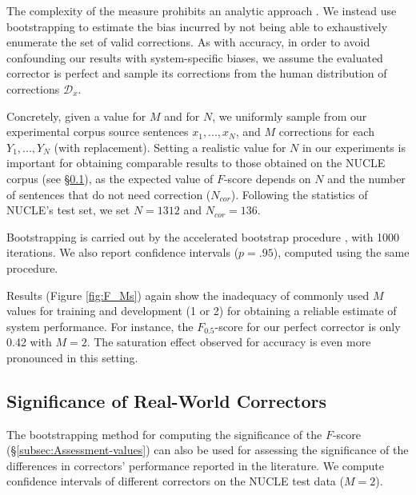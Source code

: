 \documentclass[letterpaper, 11pt]{article}
\begin{document}
The complexity of the measure prohibits an analytic approach \cite{yeh2000more}.
We instead use bootstrapping to estimate the bias incurred by not being able to exhaustively enumerate the set of valid corrections.
As with accuracy, in order to avoid confounding our results with system-specific biases,
we assume the evaluated corrector is perfect and sample its corrections from the human distribution of corrections $\mathcal{D}_x$.

Concretely, given a value for $M$ and for $N$, we uniformly sample from our experimental corpus source sentences $x_1,...,x_N$, and $M$ corrections for each $Y_1,...,Y_N$ (with replacement).
Setting a realistic value for $N$ in our experiments is important for obtaining comparable results to those obtained on the NUCLE corpus (see \S\ref{sec:real_world}),
as the expected value of $F$-score depends on $N$ and the number of sentences that do not need correction ($N_{cor}$).
Following the statistics of NUCLE's test set, we set $N=1312$ and $N_{cor}=136$.

Bootstrapping is carried out by the accelerated bootstrap procedure \cite{efron1987better}, with 1000 iterations.
We also report confidence intervals ($p=.95$), computed using the same procedure.%
%

Results (Figure \ref{fig:F_Ms}) again show the inadequacy of commonly used
$M$ values for training and development (1 or 2) for obtaining a reliable estimate
of system performance.
For instance, the $F_{0.5}$-score for our perfect corrector is only 0.42 with $M=2$.
The saturation effect observed for accuracy is even more pronounced in this setting.
\subsection{Significance of Real-World Correctors}\label{sec:real_world}

The bootstrapping method for computing the significance of the $F$-score (\S\ref{subsec:Assessment-values}) 
can also be used for assessing the significance of the differences in correctors' performance
reported in the literature.
We compute confidence intervals of different correctors on the NUCLE
test data ($M=2$).
\end{document}
